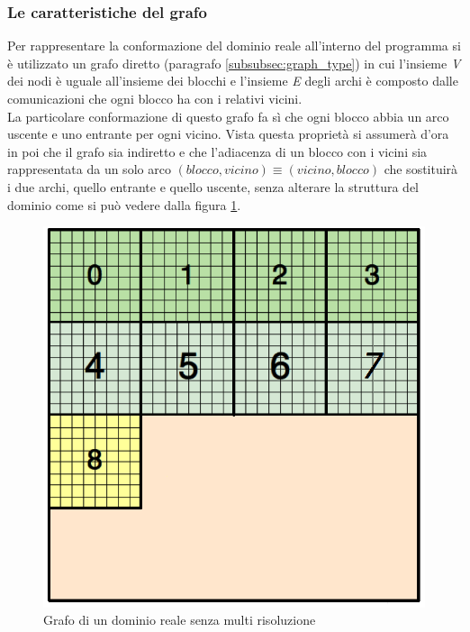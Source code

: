 \subsubsection{Le caratteristiche del grafo}
Per rappresentare la conformazione del dominio reale all'interno del programma si è utilizzato un grafo diretto (paragrafo \ref{subsubsec:graph_type}) in cui l'insieme \textit{V} dei nodi è uguale all'insieme dei blocchi e l'insieme \textit{E} degli archi è composto dalle comunicazioni che ogni blocco ha con i relativi vicini.\\
La particolare conformazione di questo grafo fa sì che ogni blocco abbia un arco uscente e uno entrante per ogni vicino. Vista questa proprietà si assumerà d'ora in poi che il grafo sia indiretto e che l'adiacenza di un blocco con i vicini sia rappresentata da un solo arco $(blocco,vicino) \equiv (vicino,blocco)$ che sostituirà i due archi, quello entrante e quello uscente, senza alterare la struttura del dominio come si può vedere dalla figura \ref{fig:domain_graph}.\\
\begin{figure}[H]
	\centering
	\includegraphics[width=1.0\textwidth]{immagini/block_on_grid.png}
	\caption{Grafo di un dominio reale senza multi risoluzione}
	\label{fig:domain_graph}
\end{figure}

